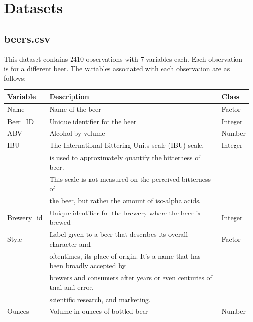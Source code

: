 \documentclass{report}
\begin{document}
\chapter{Datasets}
\label{cha:datasets}

\section{beers.csv}
\label{sec:beers}
This dataset contains 2410 observations with 7 variables each. Each observation is for a different beer. The variables associated with each observation are as follows:\\
\begin{center}
\begin{tabular}{l l l}
Variable & Description & Class\\
\hline
\hline
Name & Name of the beer & Factor\\
\hline
Beer_ID & Unique identifier for the beer & Integer\\
\hline
ABV & Alcohol by volume & Number\\
\hline
IBU & The International Bittering Units scale (IBU) scale, & Integer\\
& is used to approximately quantify the bitterness of beer.&\\
& This scale is not measured on the perceived bitterness of &\\
&the beer, but rather the amount of iso-alpha acids. &\\
\hline
Brewery_id & Unique identifier for the brewery where the beer is brewed & Integer\\
\hline
Style & Label given to a beer that describes its overall character and, & Factor\\
& oftentimes, its place of origin. It's a name that has been broadly accepted by &\\
& brewers and consumers after years or even centuries of trial and error, & \\
& scientific research, and marketing.&\\
\hline
Ounces & Volume in ounces of bottled beer & Number\\
\hline
\end{tabular}
\end{center}
\end{document}
